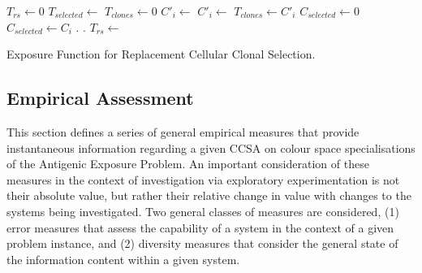 \begin{algorithm}[ht]
  \SetLine

	
	
 	$T_{rs} \leftarrow$0\;
 	{
 		\;
 	}
	$T_{selected} \leftarrow$ \;
	$T_{clones} \leftarrow$0\;	
	{
		{
			${C\prime}_i \leftarrow$ \;
			${C\prime}_i \leftarrow$ \;
			$T_{clones} \leftarrow {C\prime}_i$\;
		}
	}
	\;		
	{
		$C_{selected} \leftarrow 0$\;
		{			
			{
				$C_{selected} \leftarrow C_i$\;
			}
		}
		{
			\Tissue.\;
			\Tissue.\;
		}
	}	
	$T_{rs} \leftarrow$ \GetBestMatchingCell{\Tissue}\;
	\;
	
	\caption{Exposure Function for Replacement Cellular Clonal Selection.}
	\label{alg:cells:realisation:algorithms:rccsa:exposure}
\end{algorithm}


%
%
\subsection{Empirical Assessment}
\label{sec:cells:realised:measures}
This section defines a series of general empirical measures that provide instantaneous information regarding a given CCSA on colour space specialisations of the Antigenic Exposure Problem. An important consideration of these measures in the context of investigation via exploratory experimentation is not their absolute value, but rather their relative change in value with changes to the systems being investigated. Two general classes of measures are considered, (1) error measures that assess the capability of a system in the context of a given problem instance, and (2) diversity measures that consider the general state of the information content within a given system.

